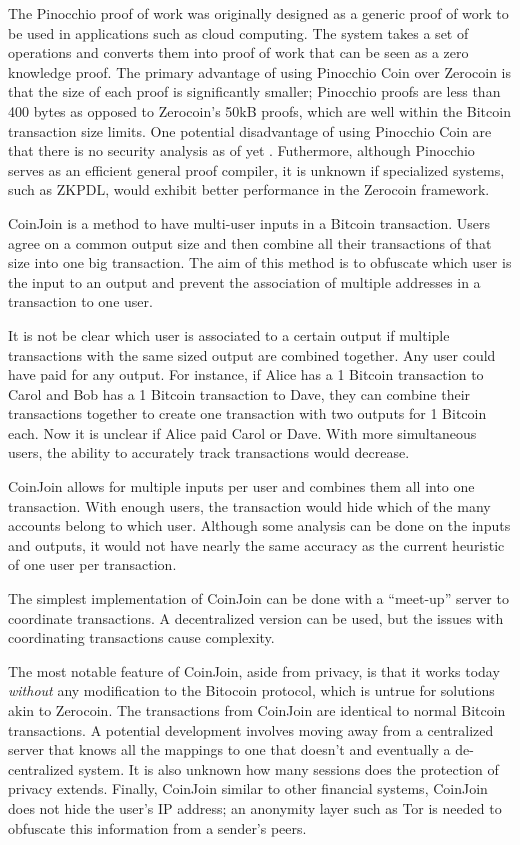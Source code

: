 The Pinocchio proof of work was originally designed as a generic proof of work to be used in applications such as cloud computing. The system takes a set of operations and converts them into proof of work that can be seen as a zero knowledge proof. The primary advantage of using Pinocchio Coin over Zerocoin is that the size of each proof is significantly smaller; Pinocchio proofs are less than 400 bytes as opposed to Zerocoin's 50kB proofs, which are well within the Bitcoin transaction size limits. One potential disadvantage of using Pinocchio Coin are that there is no security analysis as of yet \cite{pinocchio}. Futhermore, although Pinocchio serves as an efficient general proof compiler, it is unknown if specialized systems, such as ZKPDL, would exhibit better performance in the Zerocoin framework.

CoinJoin \cite{coinjoin} is a method to have multi-user inputs in a Bitcoin transaction. Users agree on a common output size and then combine all their transactions of that size into one big transaction. The aim of this method is to obfuscate which user is the input to an output and prevent the association of multiple addresses in a transaction to one user.

It is not be clear which user is associated to a certain output if multiple transactions with the same sized output are combined together. Any user could have paid for any output. For instance, if Alice has a 1 Bitcoin transaction to Carol and Bob has a 1 Bitcoin transaction to Dave, they can combine their transactions together to create one transaction with two outputs for 1 Bitcoin each. Now it is unclear if Alice paid Carol or Dave. With more simultaneous users, the ability to accurately track transactions would decrease.

CoinJoin allows for multiple inputs per user and combines them all into one transaction. With enough users, the transaction would hide which of the many accounts belong to which user. Although some analysis can be done on the inputs and outputs, it would not have nearly the same accuracy as the current heuristic of one user per transaction.

The simplest implementation of CoinJoin can be done with a ``meet-up'' server to coordinate transactions. A decentralized version can be used, but the issues with coordinating transactions cause complexity.

The most notable feature of CoinJoin, aside from privacy, is that it works today \emph{without} any modification to the Bitocoin protocol, which is untrue for solutions akin to Zerocoin. The transactions from CoinJoin are identical to normal Bitcoin transactions. A potential development involves moving away from a centralized server that knows all the mappings to one that doesn't and eventually a de-centralized system. It is also unknown how many sessions does the protection of privacy extends. Finally, CoinJoin similar to other financial systems, CoinJoin does not hide the user's IP address; an anonymity layer such as Tor is needed to obfuscate this information from a sender's peers.

